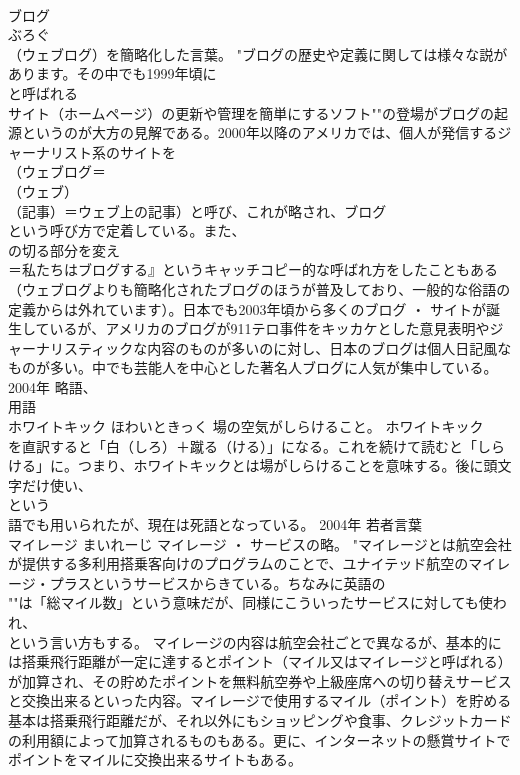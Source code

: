 \documentclass[8pt]{extreport}
\begin{document}
\begin{CJK}{UTF8}{min}
\\	ブログ 
\\	ぶろぐ	
\\	（ウェブログ）を簡略化した言葉。	"ブログの歴史や定義に関しては様々な説があります。その中でも1999年頃に
\\	と呼ばれる
\\	サイト（ホームページ）の更新や管理を簡単にするソフト""の登場がブログの起源というのが大方の見解である。2000年以降のアメリカでは、個人が発信するジャーナリスト系のサイトを
\\	（ウェブログ＝
\\	（ウェブ）
\\	（記事）＝ウェブ上の記事）と呼び、これが略され、ブログ
\\	という呼び方で定着している。また、
\\	の切る部分を変え
\\	＝私たちはブログする』というキャッチコピー的な呼ばれ方をしたこともある（ウェブログよりも簡略化されたブログのほうが普及しており、一般的な俗語の定義からは外れています）。日本でも2003年頃から多くのブログ ・ サイトが誕生しているが、アメリカのブログが911テロ事件をキッカケとした意見表明やジャーナリスティックな内容のものが多いのに対し、日本のブログは個人日記風なものが多い。中でも芸能人を中心とした著名人ブログに人気が集中している。
\\	2004年	略語、
\\	用語	
\\	ホワイトキック	ほわいときっく	場の空気がしらけること。	ホワイトキック
\\	を直訳すると「白（しろ）＋蹴る（ける）」になる。これを続けて読むと「しらける」に。つまり、ホワイトキックとは場がしらけることを意味する。後に頭文字だけ使い、
\\	という
\\	語でも用いられたが、現在は死語となっている。	2004年	若者言葉	
\\	マイレージ	まいれーじ	マイレージ ・ サービスの略。	"マイレージとは航空会社が提供する多利用搭乗客向けのプログラムのことで、ユナイテッド航空のマイレージ・プラスというサービスからきている。ちなみに英語の
\\	""は「総マイル数」という意味だが、同様にこういったサービスに対しても使われ、
\\	という言い方もする。 マイレージの内容は航空会社ごとで異なるが、基本的には搭乗飛行距離が一定に達するとポイント（マイル又はマイレージと呼ばれる）が加算され、その貯めたポイントを無料航空券や上級座席への切り替えサービスと交換出来るといった内容。マイレージで使用するマイル（ポイント）を貯める基本は搭乗飛行距離だが、それ以外にもショッピングや食事、クレジットカードの利用額によって加算されるものもある。更に、インターネットの懸賞サイトでポイントをマイルに交換出来るサイトもある。

\end{CJK}
\end{document}
